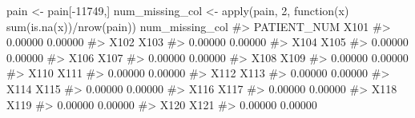 \documentclass[
  letterpaper,
]{krantz}
\makeatletter
\newenvironment{Shaded}{\begin{snugshade}}{\end{snugshade}}
\newcommand{\CommentTok}[1]{\textcolor[rgb]{0.37,0.37,0.37}{#1}}
\newcommand{\ControlFlowTok}[1]{\textcolor[rgb]{0.00,0.23,0.31}{#1}}
\newcommand{\DecValTok}[1]{\textcolor[rgb]{0.68,0.00,0.00}{#1}}
\newcommand{\FunctionTok}[1]{\textcolor[rgb]{0.28,0.35,0.67}{#1}}
\newcommand{\NormalTok}[1]{\textcolor[rgb]{0.00,0.23,0.31}{#1}}
\newcommand{\OtherTok}[1]{\textcolor[rgb]{0.00,0.23,0.31}{#1}}
\newcommand{\SpecialCharTok}[1]{\textcolor[rgb]{0.37,0.37,0.37}{#1}}
\newenvironment{kframe}{%
\medskip{}
\setlength{\fboxsep}{.8em}
 \def\at@end@of@kframe{}%
 \ifinner\ifhmode%
  \def\at@end@of@kframe{\end{minipage}}%
  \begin{minipage}{\columnwidth}%
 \fi\fi%
 \def\FrameCommand##1{\hskip\@totalleftmargin \hskip-\fboxsep
 \colorbox{shadecolor}{##1}\hskip-\fboxsep
     \hskip-\linewidth \hskip-\@totalleftmargin \hskip\columnwidth}%
 \MakeFramed {\advance\hsize-\width
   \@totalleftmargin\z@ \linewidth\hsize
   \@setminipage}}%
 {\par\unskip\endMakeFramed%
 \at@end@of@kframe}
\renewenvironment{Shaded}{\begin{kframe}}{\end{kframe}}
\makeatother
\begin{document}
\begin{Shaded}
\begin{Highlighting}[]
\NormalTok{pain }\OtherTok{\textless{}{-}}\NormalTok{ pain[}\SpecialCharTok{{-}}\DecValTok{11749}\NormalTok{,]}
\NormalTok{num\_missing\_col }\OtherTok{\textless{}{-}} \FunctionTok{apply}\NormalTok{(pain, }\DecValTok{2}\NormalTok{, }\ControlFlowTok{function}\NormalTok{(x) }\FunctionTok{sum}\NormalTok{(}\FunctionTok{is.na}\NormalTok{(x))}\SpecialCharTok{/}\FunctionTok{nrow}\NormalTok{(pain))}
\NormalTok{num\_missing\_col}
\CommentTok{\#\textgreater{}                      PATIENT\_NUM                             X101 }
\CommentTok{\#\textgreater{}                          0.00000                          0.00000 }
\CommentTok{\#\textgreater{}                             X102                             X103 }
\CommentTok{\#\textgreater{}                          0.00000                          0.00000 }
\CommentTok{\#\textgreater{}                             X104                             X105 }
\CommentTok{\#\textgreater{}                          0.00000                          0.00000 }
\CommentTok{\#\textgreater{}                             X106                             X107 }
\CommentTok{\#\textgreater{}                          0.00000                          0.00000 }
\CommentTok{\#\textgreater{}                             X108                             X109 }
\CommentTok{\#\textgreater{}                          0.00000                          0.00000 }
\CommentTok{\#\textgreater{}                             X110                             X111 }
\CommentTok{\#\textgreater{}                          0.00000                          0.00000 }
\CommentTok{\#\textgreater{}                             X112                             X113 }
\CommentTok{\#\textgreater{}                          0.00000                          0.00000 }
\CommentTok{\#\textgreater{}                             X114                             X115 }
\CommentTok{\#\textgreater{}                          0.00000                          0.00000 }
\CommentTok{\#\textgreater{}                             X116                             X117 }
\CommentTok{\#\textgreater{}                          0.00000                          0.00000 }
\CommentTok{\#\textgreater{}                             X118                             X119 }
\CommentTok{\#\textgreater{}                          0.00000                          0.00000 }
\CommentTok{\#\textgreater{}                             X120                             X121 }
\CommentTok{\#\textgreater{}                          0.00000                          0.00000 }

\end{Highlighting}
\end{Shaded}
\end{document}
